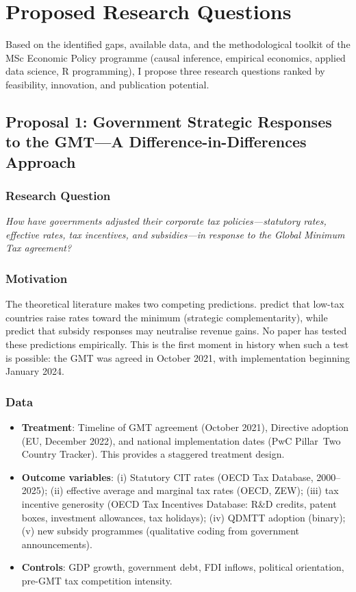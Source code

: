 \documentclass[11pt,a4paper]{article}
\begin{document}
\section{Proposed Research Questions}
\label{sec:proposals}


Based on the identified gaps, available data, and the methodological toolkit of the MSc Economic Policy programme (causal inference, empirical economics, applied data science, R programming), I propose three research questions ranked by feasibility, innovation, and publication potential.

\subsection{Proposal 1: Government Strategic Responses to the GMT---A Difference-in-Differences Approach}
\label{subsec:proposal1}

\subsubsection{Research Question}
\emph{How have governments adjusted their corporate tax policies---statutory rates, effective rates, tax incentives, and subsidies---in response to the Global Minimum Tax agreement?}

\subsubsection{Motivation}
The theoretical literature makes two competing predictions. \citet{hebous2023} predict that low-tax countries raise rates toward the minimum (strategic complementarity), while \citet{janeba2023} predict that subsidy responses may neutralise revenue gains. No paper has tested these predictions empirically. This is the first moment in history when such a test is possible: the GMT was agreed in October 2021, with implementation beginning January 2024.

\subsubsection{Data}
\begin{itemize}[nosep]
    \item \textbf{Treatment}: Timeline of GMT agreement (October 2021), Directive adoption (EU, December 2022), and national implementation dates (PwC Pillar~Two Country Tracker). This provides a staggered treatment design.
    \item \textbf{Outcome variables}: (i) Statutory CIT rates (OECD Tax Database, 2000--2025); (ii) effective average and marginal tax rates (OECD, ZEW); (iii) tax incentive generosity (OECD Tax Incentives Database: R\&D credits, patent boxes, investment allowances, tax holidays); (iv) QDMTT adoption (binary); (v) new subsidy programmes (qualitative coding from government announcements).
    \item \textbf{Controls}: GDP growth, government debt, FDI inflows, political orientation, pre-GMT tax competition intensity.
\end{itemize}
\end{document}
